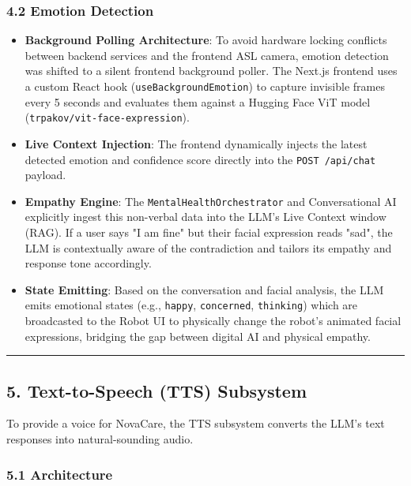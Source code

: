 \documentclass[
]{article}
\providecommand{\tightlist}{%
  \setlength{\itemsep}{0pt}\setlength{\parskip}{0pt}}
\begin{document}
\subsubsection{4.2 Emotion Detection}\label{emotion-detection}

\begin{itemize}
\tightlist
\item
  \textbf{Background Polling Architecture}: To avoid hardware locking conflicts between backend services and the frontend ASL camera, emotion detection was shifted to a silent frontend background poller. The Next.js frontend uses a custom React hook (\texttt{useBackgroundEmotion}) to capture invisible frames every 5 seconds and evaluates them against a Hugging Face ViT model (\texttt{trpakov/vit-face-expression}).
\item
  \textbf{Live Context Injection}: The frontend dynamically injects the latest detected emotion and confidence score directly into the \texttt{POST\ /api/chat} payload.
\item
  \textbf{Empathy Engine}: The \texttt{MentalHealthOrchestrator} and Conversational AI explicitly ingest this non-verbal data into the LLM's Live Context window (RAG). If a user says "I am fine" but their facial expression reads "sad", the LLM is contextually aware of the contradiction and tailors its empathy and response tone accordingly.
\item
  \textbf{State Emitting}: Based on the conversation and facial analysis, the LLM emits emotional states (e.g., \texttt{happy}, \texttt{concerned}, \texttt{thinking}) which are broadcasted to the Robot UI to physically change the robot's animated facial expressions, bridging the gap between digital AI and physical empathy.
\end{itemize}

\begin{center}\rule{0.5\linewidth}{0.5pt}\end{center}

\subsection{5. Text-to-Speech (TTS)
Subsystem}\label{text-to-speech-tts-subsystem}

To provide a voice for NovaCare, the TTS subsystem converts the LLM's
text responses into natural-sounding audio.

\subsubsection{5.1 Architecture}\label{architecture}
\end{document}
